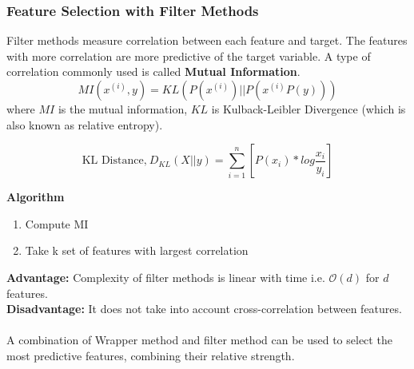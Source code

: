 \documentclass[12pt,a4paper,titlepage,portrait,openany]{book}
\begin{document}
	\subsubsection{Feature Selection with Filter Methods}
	Filter methods measure correlation between each feature and target. The features with more correlation are more predictive of the target variable. A type of correlation commonly used is called \textbf{Mutual Information}.
	$$MI(x^{(i)},y) = KL\left(P\left(x^{(i)}\right) || P\left(x^{(i)}P(y)\right)\right)$$
	where $MI$ is the mutual information, $KL$ is Kulback-Leibler Divergence (which is also known as relative entropy).
	
	$$\text{KL Distance,}~D_{KL}(X||y) = \sum_{i=1}^{n}\left[P(x_i)*log\dfrac{x_i}{y_i}\right]$$
	
	\textbf{Algorithm}
	\begin{enumerate}
		\item Compute MI
		\item Take k set of features with largest correlation
	\end{enumerate} 
	\textbf{Advantage: }Complexity of filter methods is linear with time i.e. $\mathcal{O}(d)$ for $d$ features. \\
	\textbf{Disadvantage: }It does not take into account cross-correlation between features. \\\\
	A combination of Wrapper method and filter method can be used to select the most predictive features, combining their relative strength.
	
	
	
	
	
	
	
	
	
\end{document}

